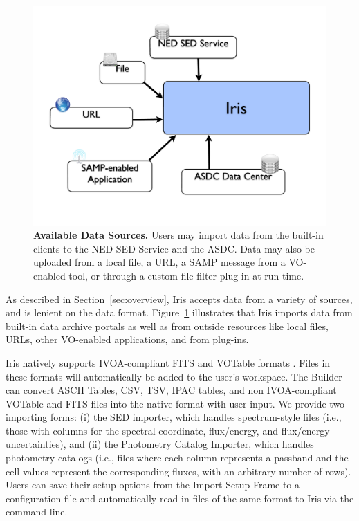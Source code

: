\documentclass[preprint,authoryear,5p]{elsarticle}
\begin{document}
\begin{figure}[h!] \begin{center}
\includegraphics[width=\columnwidth]{IrisDiagrams.002.pdf}
\caption{\textbf{\label{fig:data_sources} Available Data
Sources.}  Users may import data from the built-in
clients to the NED SED Service and the ASDC. Data may also be uploaded from 
a local file, a URL, a SAMP message from a VO-enabled tool, 
or through a custom file filter plug-in at run time.} \end{center}
\end{figure}

As described in Section~\ref{sec:overview}, Iris accepts data from a variety of
sources, and is lenient on the data format. Figure~\ref{fig:data_sources}
illustrates that Iris imports data from built-in data archive portals as well as
from outside resources like local files, URLs, other VO-enabled applications,
and from plug-ins.

Iris natively supports IVOA-compliant FITS and VOTable formats
\citep{2012arXiv1204.3055M}. Files in these formats will automatically be added
to the user's workspace. The Builder can convert ASCII Tables, CSV,
TSV, IPAC tables, and non IVOA-com\-pli\-ant VOTable and FITS files
into the native format with user input. We provide two importing forms: (i) the
SED importer, which handles spectrum-style files (i.e., those with columns for
the spectral coordinate, flux/energy, and flux/energy uncertainties), and (ii)
the Photometry Catalog Importer, which handles photometry catalogs (i.e., files
where each column represents a passband and the cell values represent the
corresponding fluxes, with an arbitrary number of rows). Users can save their
setup options from the Import Setup Frame to a configuration file and
automatically read-in files of the same format to Iris via the command line.
\end{document}
